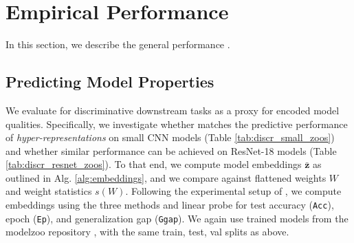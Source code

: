 \section{Empirical Performance}
In this section, we describe the general performance \ourmethod.
% 
\subsection{Predicting Model Properties}
\label{sec:property_prediction}
We evaluate \ourmethod for discriminative downstream tasks as a proxy for encoded model qualities. Specifically, we investigate whether \ourmethod matches the predictive performance of \textit{hyper-representations} on small CNN models (Table \ref{tab:discr_small_zoos}) and whether similar performance can be achieved on ResNet-18 models (Table \ref{tab:discr_resnet_zoos}). 
To that end, we compute model embeddings $\mathbf{\bar{z}}$ as outlined in Alg. \ref{alg:embeddings}, and we compare against flattened weights $W$ and weight statistics $s(W)$.
Following the experimental setup of \citep{eilertsenClassifyingClassifierDissecting2020,unterthinerPredictingNeuralNetwork2020,schurholtSelfSupervisedRepresentationLearning2021}, we compute embeddings using the three methods and linear probe for test accuracy (\texttt{Acc}), epoch (\texttt{Ep}), and generalization gap (\texttt{Ggap}). We again use trained models from the modelzoo repository \citep{schurholtModelZoosDataset2022}, with the same train, test, val splits as above. 
% 
